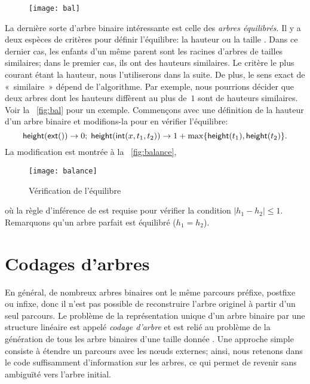 \begin{wrapfigure}[7]{r}[0pt]{0pt}
\centering
\texttt{[image: bal]}
\caption{}
\label{fig:bal}
\end{wrapfigure}
La dernière sorte d'arbre binaire intéressante est celle des
\emph{arbres équilibrés}. Il y a
deux espèces de critères pour définir l'équilibre:
la hauteur ou la taille
\citep{NievergeltReingold_1972,HiraiYamamoto_2011}. Dans ce dernier
cas, les enfants d'un même parent sont les racines d'arbres de tailles
similaires; dans le premier cas, ils ont des hauteurs similaires. Le
critère le plus courant étant la hauteur, nous l'utiliserons dans la
suite. De plus, le sens exact de «~similaire~» dépend de
l'algorithme. Par exemple, nous pourrions décider que deux arbres dont
les hauteurs diffèrent au plus de~\(1\) sont de hauteurs
similaires. Voir la \fig~\vref{fig:bal} pour un exemple. Commençons
avec une définition de la hauteur d'un arbre binaire et
modifions-la pour en vérifier l'équilibre:
\begin{equation*}
\abovedisplayskip=4pt
\belowdisplayskip=3pt
\fun{height}(\fun{ext}()) \rightarrow 0;
\;
\fun{height}(\fun{int}(x,t_1,t_2)) \rightarrow 1 +
\max\{\fun{height}(t_1), \fun{height}(t_2)\}.
\end{equation*}
La modification est montrée à la \fig~\vref{fig:balance},
\begin{figure}[!b]
\centering
\texttt{[image: balance]}
\caption{Vérification de l'équilibre}
\label{fig:balance}
\end{figure}
où la règle d'inférence de
 est requise pour
vérifier la condition \(|h_1 - h_2| \leqslant 1\). Remarquons qu'un
arbre parfait est équilibré (\(h_1 = h_2\)).

\section{Codages d'arbres}

En général, de nombreux arbres binaires ont le même parcours préfixe,
postfixe ou infixe, donc il n'est pas possible de reconstruire l'arbre
originel à partir d'un seul parcours. Le problème de la représentation
unique d'un arbre binaire par une structure linéaire est appelé
\emph{codage d'arbre} \citep{Makinen_1991} et est relié au problème de
la génération de tous les arbre binaires d'une taille donnée
\citep[7.2.1.6]{Knuth_2011}. Une approche simple consiste à étendre un
parcours avec les nœuds externes; ainsi, nous retenons dans le
code suffisamment d'information sur les arbres, ce qui permet de
revenir sans ambiguïté vers l'arbre initial.

